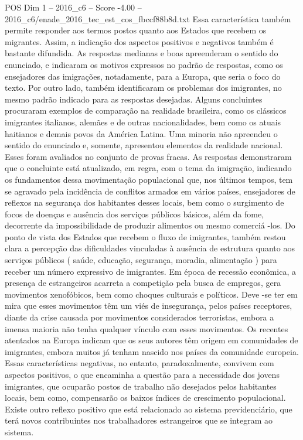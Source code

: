 \begin{textsample}{POS Dim 1 – 2016\_c6 – Score -4.00 – 2016\_c6/enade\_2016\_tec\_est\_cos\_fbccf88b8d.txt}
Essa característica também permite responder aos termos postos quanto aos Estados que recebem os migrantes.
Assim, a indicação dos aspectos positivos e negativos também é bastante difundida.
As respostas medianas e boas apreenderam o sentido do enunciado, e indicaram os motivos expressos no padrão de respostas, como os ensejadores das imigrações, notadamente, para a Europa, que seria o foco do texto.
Por outro lado, também identificaram os problemas dos imigrantes, no mesmo padrão indicado para as respostas desejadas.
Alguns concluintes procuraram exemplos de comparação na realidade brasileira, como os clássicos imigrantes italianos, alemães e de outras nacionalidades, bem como os atuais haitianos e demais povos da América Latina.
Uma minoria não apreendeu o sentido do enunciado e, somente, apresentou elementos da realidade nacional.
Esses foram avaliados no conjunto de provas fracas.
As respostas demonstraram que o concluinte está atualizado, em regra, com o tema da imigração, indicando os fundamentos dessa movimentação populacional que, nos últimos tempos, tem se agravado pela incidência de conflitos armados em vários países, ensejadores de reflexos na segurança dos habitantes desses locais, bem como o surgimento de focos de doenças e ausência dos serviços públicos básicos, além da fome, decorrente da impossibilidade de produzir alimentos ou mesmo comerciá -los.
Do ponto de vista dos Estados que recebem o fluxo de imigrantes, também restou clara a percepção das dificuldades vinculadas à ausência de estrutura quanto aos serviços públicos ( saúde, educação, segurança, moradia, alimentação ) para receber um número expressivo de imigrantes.
Em época de recessão econômica, a presença de estrangeiros acarreta a competição pela busca de empregos, gera movimentos xenofóbicos, bem como choques culturais e políticos.
Deve -se ter em mira que esses movimentos têm um viés de insegurança, pelos países receptores, diante da crise causada por movimentos considerados terroristas, embora a imensa maioria não tenha qualquer vínculo com esses movimentos.
Os recentes atentados na Europa indicam que os seus autores têm origem em comunidades de imigrantes, embora muitos já tenham nascido nos países da comunidade europeia.
Essas características negativas, no entanto, paradoxalmente, convivem com aspectos positivos, o que encaminha a questão para a necessidade dos jovens imigrantes, que ocuparão postos de trabalho não desejados pelos habitantes locais, bem como, compensarão os baixos índices de crescimento populacional.
Existe outro reflexo positivo que está relacionado ao sistema previdenciário, que terá novos contribuintes nos trabalhadores estrangeiros que se integram ao sistema.

\end{textsample}
